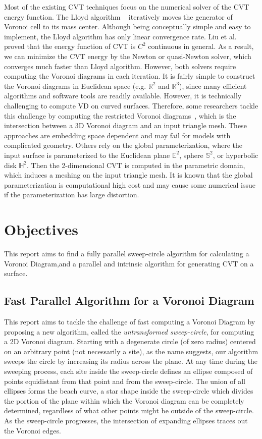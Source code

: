 Most of the existing CVT techniques focus on the numerical solver of
the CVT energy function. The Lloyd algorithm ~\cite{Lloyd:1982} iteratively
moves the generator of Voronoi cell to its mass center. Although
being conceptually simple and easy to implement, the Lloyd algorithm
has only linear convergence rate. Liu et al. ~\cite{Liu:2009:CVT} proved that the energy function of CVT is $C^2$ continuous in general. As a result, we
can minimize the CVT energy by the Newton or quasi-Newton solver,
which converges much faster than Lloyd algorithm. However, both
solvers require computing the Voronoi diagrams in each iteration. It
is fairly simple to construct the Voronoi diagrams in Euclidean
space (e.g. $\mathbb{R}^2$ and $\mathbb{R}^3$), since many efficient
algorithms and software tools are readily available. However, it is
technically challenging to compute VD on curved surfaces. Therefore,
some researchers tackle this challenge by computing the restricted
Voronoi diagrams~\cite{Yan:2009:IRF:1735603.1735629}, which is the
intersection between a 3D Voronoi diagram and an input triangle mesh.
These approaches are embedding space dependent and may fail for
models with complicated geometry. Others rely on the global
parameterization, where the input surface is parameterized to the
Euclidean plane $\mathbb{E}^2$, sphere $\mathbb{S}^2$, or hyperbolic
disk $\mathbb{H}^{2}$. Then the 2-dimensional CVT is computed in the
parametric domain, which induces a meshing on the input triangle mesh. It
is known that the global parameterization is computational high cost
and may cause some numerical issue if the parameterization has large
distortion.


\section{Objectives}

This report aims to find a fully parallel sweep-circle algorithm for calculating a Voronoi Diagram,and a parallel and intrinsic algorithm for generating CVT on a surface.

\subsection{Fast Parallel Algorithm for a Voronoi Diagram}

This report aims to tackle the challenge of fast computing a Voronoi Diagram by proposing a new algorithm, called the {\em untransformed
sweep-circle}, for computing a 2D Voronoi diagram. Starting with a
degenerate circle (of zero radius) centered on an arbitrary point
(not necessarily a site), as the name suggests, our algorithm sweeps
the circle by increasing its radius across the plane. At any time
during the sweeping process, each site inside the sweep-circle
defines an ellipse composed of points equidistant from that point
and from the sweep-circle. The union of all ellipses forms the beach
curve, a star shape inside the sweep-circle which divides the
portion of the plane within which the Voronoi diagram can be
completely determined, regardless of what other points might be
outside of the sweep-circle. As the sweep-circle progresses, the
intersection of expanding ellipses traces out the Voronoi edges.


